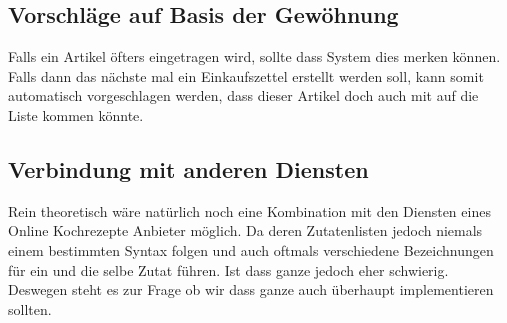 \documentclass{article}
\begin{document}
\begin{flushleft}
\subsection{Vorschläge auf Basis der Gewöhnung}

Falls ein Artikel öfters eingetragen wird, sollte dass System dies merken können. Falls dann das nächste mal ein Einkaufszettel erstellt werden soll, kann somit automatisch vorgeschlagen werden, dass dieser Artikel doch auch mit auf die Liste kommen könnte.

\subsection{Verbindung mit anderen Diensten}

Rein theoretisch wäre natürlich noch eine Kombination mit den Diensten eines Online Kochrezepte Anbieter möglich. Da deren Zutatenlisten jedoch niemals einem bestimmten Syntax folgen und auch oftmals verschiedene Bezeichnungen für ein und die selbe Zutat führen. Ist dass ganze jedoch eher schwierig. Deswegen steht es zur Frage ob wir dass ganze auch überhaupt implementieren sollten.

\end{flushleft}
\end{document}
